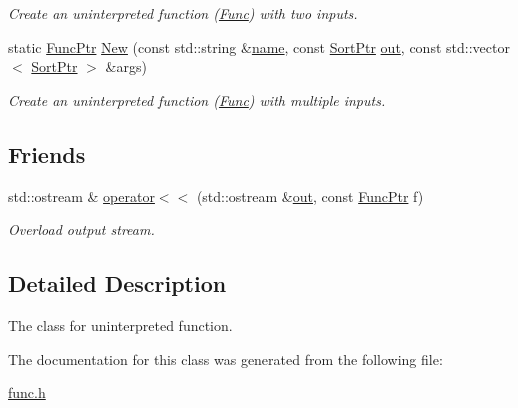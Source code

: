 \begin{DoxyCompactItemize}
\begin{DoxyCompactList}\small\item\em Create an uninterpreted function (\mbox{\hyperlink{classilang_1_1_func}{Func}}) with two inputs. \end{DoxyCompactList}\item 
\mbox{\label{classilang_1_1_func_a253f2358895c0776d83c4727491c3253}} 
static \mbox{\hyperlink{classilang_1_1_func_a91aa192ceb8b9025423fdb95c8429282}{Func\+Ptr}} \mbox{\hyperlink{classilang_1_1_func_a253f2358895c0776d83c4727491c3253}{New}} (const std\+::string \&\mbox{\hyperlink{classilang_1_1_object_acf20b072e69f572910d7d80c93af0b38}{name}}, const \mbox{\hyperlink{namespaceilang_ae01073336878d60a231f4fe96d45ab55}{Sort\+Ptr}} \mbox{\hyperlink{classilang_1_1_func_a58414a3455af0484ccfcce8401b02d37}{out}}, const std\+::vector$<$ \mbox{\hyperlink{namespaceilang_ae01073336878d60a231f4fe96d45ab55}{Sort\+Ptr}} $>$ \&args)
\begin{DoxyCompactList}\small\item\em Create an uninterpreted function (\mbox{\hyperlink{classilang_1_1_func}{Func}}) with multiple inputs. \end{DoxyCompactList}\end{DoxyCompactItemize}
\subsection*{Friends}
\begin{DoxyCompactItemize}
\item 
\mbox{\label{classilang_1_1_func_a7e4f3c666ce062caf80e3fd3328cd183}} 
std\+::ostream \& \mbox{\hyperlink{classilang_1_1_func_a7e4f3c666ce062caf80e3fd3328cd183}{operator$<$$<$}} (std\+::ostream \&\mbox{\hyperlink{classilang_1_1_func_a58414a3455af0484ccfcce8401b02d37}{out}}, const \mbox{\hyperlink{classilang_1_1_func_a91aa192ceb8b9025423fdb95c8429282}{Func\+Ptr}} f)
\begin{DoxyCompactList}\small\item\em Overload output stream. \end{DoxyCompactList}\end{DoxyCompactItemize}


\subsection{Detailed Description}
The class for uninterpreted function. 

The documentation for this class was generated from the following file\+:\begin{DoxyCompactItemize}
\item 
\mbox{\hyperlink{func_8h}{func.\+h}}\end{DoxyCompactItemize}
